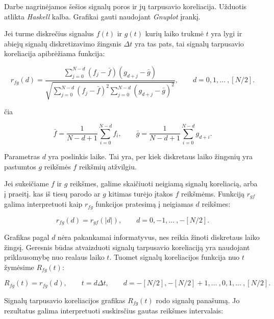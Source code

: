 Darbe nagrinėjamos šešios signalų poros ir jų tarpusavio koreliacija.
Užduotis atlikta \textit{Haskell} kalba. Grafikai gauti naudojant \textit{Gnuplot} įrankį.

Jei turme diskrečius signalus \(f(t)\) ir \(g(t)\) kurių laiko trukmė \(t\) yra lygi
ir abiejų signalų diskretizavimo žingsnis \(\Delta t\) yra tas pats,
tai signalų tarpusavio koreliacija apibrėžiama funkcija:

\begin{equation}
    r_{fg} (d) = \dfrac{\displaystyle \sum\limits_{j=0}^{N-d} {(f_j - \bar{f}) (g_{d+j} - \bar{g})}} {\sqrt{\displaystyle \sum\limits_{j=0}^{N-d} (f_j - \bar{f})^2 \displaystyle \sum\limits_{j=0}^{N-d} (g_{d+j} - \bar{g})^2}},\qquad
    d = 0,1, \ldots\ ,[N/2].
\end{equation}

čia

\begin{equation}
    \bar{f} = \dfrac{1} {N-d+1} \displaystyle \sum\limits_{i=0}^{N-d} {f_i},\qquad
    \bar{g} = \dfrac{1} {N-d+1} \displaystyle \sum\limits_{i=0}^{N-d} {g_{d+i}}.
\end{equation}

Parametras \(d\) yra poslinkis laike.
Tai yra, per kiek diskretaus laiko žingsnių yra pastumtos \(g\) reikšmės \(f\) reikšmių atžvilgiu.

Jei sukeičiame \(f\) ir \(g\) reikšmes, galime skaičiuoti neigiamą signalų koreliacią, arba į praeitį.
kas iš tiesų parodo ar \(g\) kitimas turėjo įtakos \(f\) reikšmėms.
Funkciją \(r_{gf}\) galima interpretuoti kaip \(r_{fg}\) funkcijos pratesimą į neigiamas \(d\) reikšmes:

\begin{equation}
    r_{fg} (d) = r_{gf} (|d|),\qquad d = 0,-1, \ldots\ ,-[N/2].
\end{equation}

Grafikas pagal \(d\) nėra pakankamai informatyvus, nes reikia žinoti diskretaus laiko žingsį.
Geresnis būdas atvaizduoti signalų tarpusavio koreliaciją yra naudojant priklausomybę nuo realaus laiko \(t\).
Tuomet signalų koreliacijos funkcija nuo \(t\) žymėsime \(R_{fg}(t)\):

\begin{equation}
    R_{fg} (t) = r_{fg} (d),\qquad t = d\Delta t,\qquad d = -[N/2],-[N/2]+1, \ldots\ ,0,1, \ldots\ ,[N/2].
\end{equation}

Signalų tarpusavio koreliacijos grafikas \(R_{fg}(t)\) rodo signalų panašumą.
Jo rezultatus galima interpretuoti suskirsčius gautas reikšmes intervalais:

